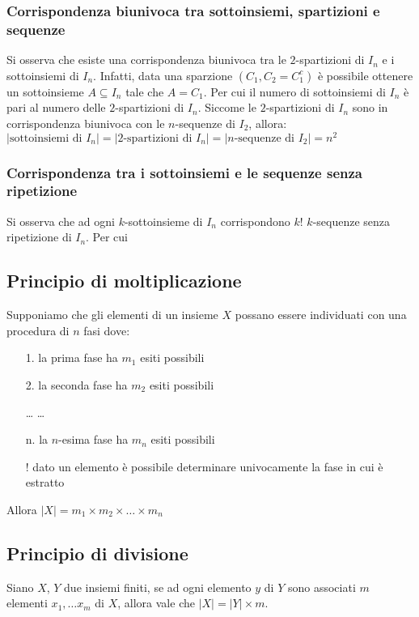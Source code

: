 \documentclass[a4paper]{article}
\begin{document}
\subsubsection*{Corrispondenza biunivoca tra sottoinsiemi, spartizioni e sequenze}
Si osserva che esiste una corrispondenza biunivoca tra le \(2\)-spartizioni di \(I_n\) e i sottoinsiemi di \(I_n\). Infatti, data
una sparzione \((C_1,C_2 = C_1^c)\) è possibile ottenere un sottoinsieme \(A \subseteq I_n\) tale che \(A = C_1\). Per cui il numero
di sottoinsiemi di \(I_n\) è pari al numero delle \(2\)-spartizioni di \(I_n\). Siccome le \(2\)-spartizioni di \(I_n\) sono in 
corrispondenza biunivoca con le \(n\)-sequenze di \(I_2\), allora: \\
\(|\text{sottoinsiemi di } I_n| = |2\text{-spartizioni di } I_n| = |n\text{-sequenze di } I_2| = n^2\)

\subsubsection*{Corrispondenza tra i sottoinsiemi e le sequenze senza ripetizione}
Si osserva che ad ogni \(k\)-sottoinsieme di \(I_n\) corrispondono \(k!\) \(k\)-sequenze senza ripetizione di \(I_n\). Per cui

\subsection{Principio di moltiplicazione}
Supponiamo che gli elementi di un insieme \(X\) possano essere individuati con una procedura di \(n\) fasi dove:
\begin{itemize}[topsep=3pt, itemsep=0pt]
	\item[1.] la prima fase ha \(m_1\) esiti possibili
	\item[2.] la seconda fase ha \(m_2\) esiti possibili
	\item[\dots] \dots
	\item[n.] la \(n\)-esima fase ha \(m_n\) esiti possibili
	\item[!] dato un elemento è possibile determinare univocamente la fase in cui è estratto
\end{itemize}
Allora \(|X| = m_1 \times m_2 \times \dots \times m_n\)

\subsection{Principio di divisione}
Siano \(X\), \(Y\) due insiemi finiti, se ad ogni elemento \(y\) di \(Y\) sono associati \(m\) elementi \(x_1, \dots x_m\) di \(X\),
allora vale che \(|X| = |Y| \times m\).
\end{document}

